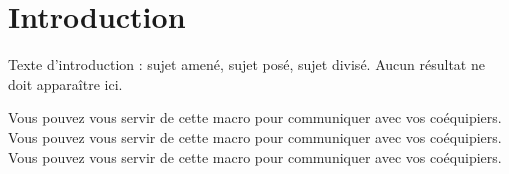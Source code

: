 \documentclass[../main.tex]{subfiles}
\begin{document}

    
\chapter{Introduction}
Texte d'introduction :
sujet amené, sujet posé, sujet divisé.
Aucun résultat ne doit apparaître ici.

 Vous pouvez vous servir de cette macro pour communiquer avec vos coéquipiers. \\
 Vous pouvez vous servir de cette macro pour communiquer avec vos coéquipiers. \\
 Vous pouvez vous servir de cette macro pour communiquer avec vos coéquipiers. \\
\end{document}
